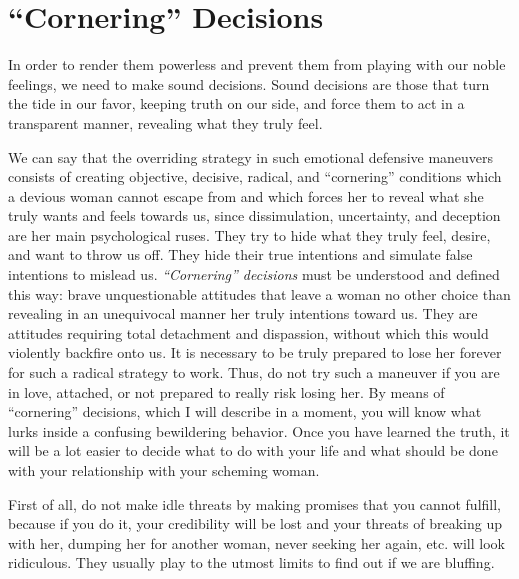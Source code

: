 \section{\enquote{Cornering} Decisions}

\par In order to render them powerless and prevent them from playing with our noble feelings, we need to make sound decisions. Sound decisions are those that turn the tide in our favor, keeping truth on our side, and force them to act in a transparent manner, revealing what they truly feel.

\par We can say that the overriding strategy in such emotional defensive maneuvers consists of creating objective, decisive, radical, and \enquote{cornering} conditions which a devious woman cannot escape from and which forces her to reveal what she truly wants and feels towards us, since dissimulation, uncertainty, and deception are her main psychological ruses. They try to hide what they truly feel, desire, and want to throw us off. They hide their true intentions and simulate false intentions to mislead us. \textit{\enquote{Cornering} decisions} must be understood and defined this way: brave unquestionable attitudes that leave a woman no other choice than revealing in an unequivocal manner her truly intentions toward us. They are attitudes requiring total detachment and dispassion, without which this would violently backfire onto us. It is necessary to be truly prepared to lose her forever for such a radical strategy to work. Thus, do not try such a maneuver if you are in love, attached, or not prepared to really risk losing her. By means of \enquote{cornering} decisions, which I will describe in a moment, you will know what lurks inside a confusing bewildering behavior. Once you have learned the truth, it will be a lot easier to decide what to do with your life and what should be done with your relationship with your scheming woman.

\par First of all, do not make idle threats by making promises that you cannot fulfill, because if you do it, your credibility will be lost and your threats of breaking up with her, dumping her for another woman, never seeking her again, etc. will look ridiculous\footnotemark[19]. They usually play to the utmost limits to find out if we are bluffing.


